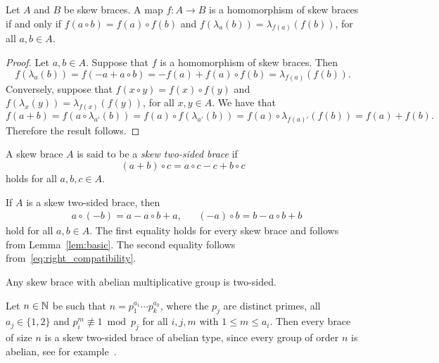 \begin{lemma}\label{lem:homlambda}
    Let $A$ and $B$ be skew braces. A map $f\colon A\to B$ is a homomorphism of skew braces if and only if $f(a\circ b)=f(a)\circ f(b)$ and $f(\lambda_a(b))=\lambda_{f(a)}(f(b))$, for all $a,b\in A$.
\end{lemma}

\begin{proof}
    Let $a,b\in A$. Suppose that $f$ is a homomorphism of skew braces. Then
    \[ f(\lambda_a(b))=f(-a+a\circ b)=-f(a)+f(a)\circ f(b)=\lambda_{f(a)}(f(b)).\]
    Conversely, suppose that $f(x\circ y)=f(x)\circ f(y)$ and $f(\lambda_x(y))=\lambda_{f(x)}(f(y))$, for all $x,y\in A$. We have that 
    \[f(a+b)=f(a\circ\lambda_{a'}(b))=f(a)\circ f(\lambda_{a'}(b))=f(a)\circ \lambda_{f(a)'}(f(b))=f(a)+f(b).\]
    Therefore the result follows. 
\end{proof}



\begin{definition}
	A skew brace $A$ is said to be a \emph{skew two-sided brace} if 
	\begin{equation}
	\label{eq:right_compatibility}
	(a+b)\circ c=a\circ c-c+b\circ c
	\end{equation}
	holds for all $a,b,c\in A$. 
\end{definition}

If $A$ is a skew two-sided brace, then 
\begin{align}
\label{eq:2sided}
&a\circ(-b)=a-a\circ b+a,
&&(-a)\circ b=b-a\circ b+b    
\end{align}
hold for all $a,b\in A$. The first equality holds for every skew brace and follows from Lemma~\ref{lem:basic}. 
The second equality follows from~\eqref{eq:right_compatibility}. 

\begin{example}
  Any skew brace with abelian multiplicative group is 
  two-sided.
\end{example}

\begin{example}
  Let $n\in\mathbb{N}$ be such that $n=p_1^{a_1}\cdots p_k^{a_k}$, where the $p_j$ are
  distinct primes, all $a_j\in\{1,2\}$ and $p_i^m\not\equiv 1\bmod{p_j}$ for
  all $i,j,m$ with $1\leq m\leq a_i$. Then every brace of size $n$ is a skew
  two-sided brace of abelian type, since every group of order $n$ is abelian, see for
  example~\cite{MR1786236}.  
\end{example}

